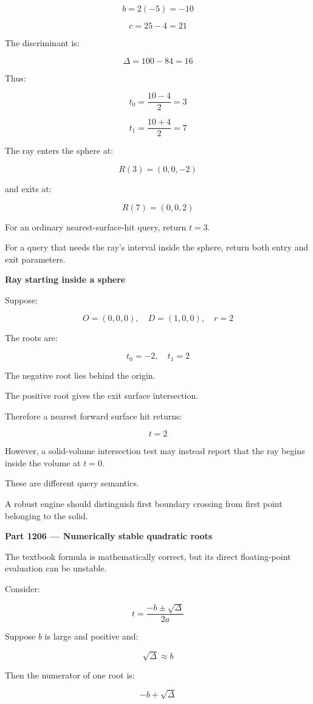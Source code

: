 \[
b=2(-5)=-10
\]

\[
c=25-4=21
\]

The discriminant is:

\[
\Delta=100-84=16
\]

Thus:

\[
t_0=\frac{10-4}{2}=3
\]

\[
t_1=\frac{10+4}{2}=7
\]

The ray enters the sphere at:

\[
R(3)=(0,0,-2)
\]

and exits at:

\[
R(7)=(0,0,2)
\]

For an ordinary nearest-surface-hit query, return \(t=3\).

For a query that needs the ray's interval inside the sphere, return both entry and exit parameters.

\textbf{Ray starting inside a sphere}

Suppose:

\[
O=(0,0,0),\quad D=(1,0,0),\quad r=2
\]

The roots are:

\[
t_0=-2,\quad t_1=2
\]

The negative root lies behind the origin.

The positive root gives the exit surface intersection.

Therefore a nearest forward surface hit returns:

\[
t=2
\]

However, a solid-volume intersection test may instead report that the ray begins inside the volume at \(t=0\).

These are different query semantics.

A robust engine should distinguish first boundary crossing from first point belonging to the solid.

\textbf{Part 1206 --- Numerically stable quadratic roots}

The textbook formula is mathematically correct, but its direct floating-point evaluation can be unstable.

Consider:

\[
t=\frac{-b\pm\sqrt{\Delta}}{2a}
\]

Suppose \(b\) is large and positive and:

\[
\sqrt{\Delta}\approx b
\]

Then the numerator of one root is:

\[
-b+\sqrt{\Delta}
\]

